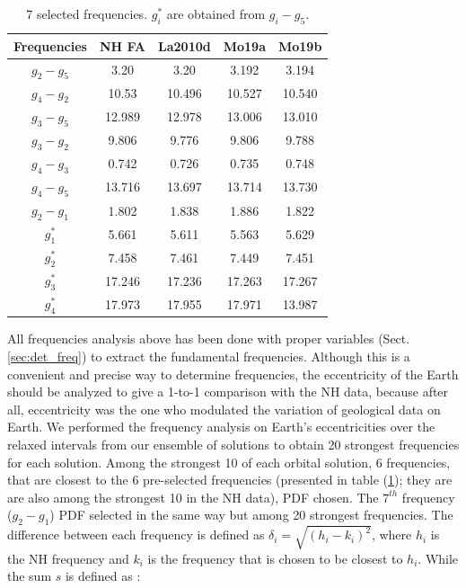 \documentclass[12pt]{article}
\begin{document}
		\begin{table}[t]
		\centering
		\begin{tabular}[t]{ccccc}
			\toprule
			Frequencies & NH FA&  La2010d & Mo19a & Mo19b\\
			\midrule
			$g_2 - g_5$& 3.20 & 3.20 & 3.192 & 3.194 \\
			$g_4 - g_2$& 10.53 & 10.496 & 10.527 & 10.540\\
			$g_3 - g_5$& 12.989 & 12.978 &13.006 & 13.010\\
			$g_3 - g_2$& 9.806 & 9.776 & 9.806 & 9.788\\        
			$g_4 - g_3$& 0.742 & 0.726 & 0.735 & 0.748\\    
			$g_4 - g_5$& 13.716 & 13.697 &13.714 & 13.730\\        
			$g_2 - g_1$& 1.802 & 1.838 & 1.886 & 1.822\\    
			
			$g_1^*$& 5.661 & 5.611 &  5.563 & 5.629 \\
			$g_2^*$& 7.458 & 7.461 & 7.449 & 7.451\\
			$g_3^*$& 17.246 & 17.236 & 17.263& 17.267 \\
			$g_4^*$& 17.973 & 17.955 & 17.971& 13.987\\        
			\bottomrule
		\end{tabular}
		\caption{ 7 selected frequencies. $g_i^*$ are obtained from $g_i - g_5$. }
		\label{table:f_compare}
	\end{table}
	All frequencies analysis above has been done with proper variables (Sect. \ref{sec:det_freq}) to extract the fundamental frequencies. Although this is a convenient and precise way to determine frequencies, the eccentricity of the Earth should be analyzed to give a 1-to-1 comparison with the NH data, because after all, eccentricity was the one who modulated the variation of geological data on Earth. We performed the frequency analysis on Earth's eccentricities over the relaxed intervals from our ensemble of solutions to obtain 20 strongest frequencies for each solution. Among the strongest 10 of each orbital solution, 6 frequencies, that are closest to the 6 pre-selected frequencies (presented in table (\ref{table:f_compare}); they are are also among the strongest 10 in the NH data), PDF chosen. The $7^{th}$ frequency ($g_2 - g_1$) PDF selected in the same way but among  20 strongest frequencies. The difference between each frequency is defined as $\delta_i = \sqrt{(h_i - k_i)^2}$, where $h_i$ is the NH frequency and $k_i$ is the frequency that is chosen to be closest to $h_i$. While the sum $s$ is defined as : 
\end{document}
